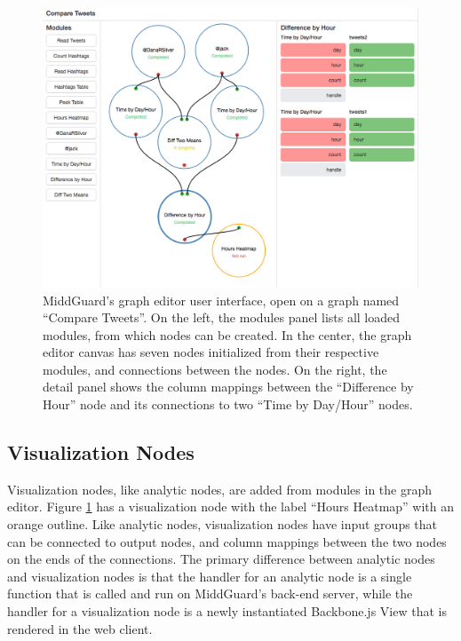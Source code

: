 \documentclass[midd]{thesis}
\begin{document}
\begin{figure}[!ht]
  \centering
  \includegraphics[width=1\textwidth]{compare-tweets-graph-editor-no-sidebar}
  \caption{MiddGuard's graph editor user interface, open on a graph named
  ``Compare Tweets''. On the left, the modules panel lists all loaded modules,
  from which nodes can be created. In the center, the graph editor canvas has
  seven nodes initialized from their respective modules, and connections between
  the nodes. On the right, the detail panel shows the column mappings between
  the ``Difference by Hour'' node and its connections to two
  ``Time by Day/Hour'' nodes.}
  \label{fig:grapheditor}
\end{figure}

\subsection{Visualization Nodes}

Visualization nodes, like analytic nodes, are added from modules in the graph
editor. Figure \ref{fig:grapheditor} has a visualization node with the label
``Hours Heatmap'' with an orange outline. Like analytic nodes, visualization
nodes have input groups that can be connected to output nodes, and column
mappings between the two nodes on the ends of the connections. The primary
difference between analytic nodes and visualization nodes is that the handler
for an analytic node is a single function that is called and run on MiddGuard's
back-end server, while the handler for a visualization node is a newly
instantiated Backbone.js View \cite{backbone} that is rendered in the web
client.
\end{document}
